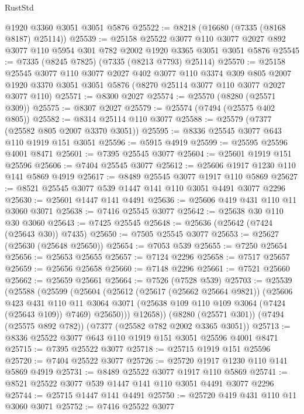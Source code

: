 \begin{lexlean}{RustStd}
\begin{coremodule}
    @1920
    @3360
    @3051
    @3051
    @5876
@25522 := @8218 (@16680 (@7335 (@8168 @8187) @25114))
@25539 := @25158
    @25522
    @3077
    @110
    @3077
    @2027
    @892
    @3077
    @110
    @5954
    @301
    @782
    @2002
    @1920
    @3365
    @3051
    @3051
    @5876
@25545 := @7335 (@8245 @7825) (@7335 (@8213 @7793) @25114)
@25570 := @25158
    @25545
    @3077
    @110
    @3077
    @2027
    @402
    @3077
    @110
    @3374
    @309
    @805
    @2007
    @1920
    @3370
    @3051
    @3051
    @5876
    (@8270 @25114 @3077 @110 @3077 @2027 @3077 @110)
@25571 := @8300 @2027
@25574 := @25570 (@8280 (@25571 @309))
@25575 := @8307 @2027
@25579 := @25574 (@7494 (@25575 @402 @805))
@25582 := @8314 @25114 @110 @3077
@25588 := @25579 (@7377 (@25582 @805 @2007 @3370 @3051))
@25595 := @8336 @25545 @3077 @643 @110 @1919 @151 @3051
@25596 := @5915 @4919
@25599 := @25595 @25596 @4001 @8471
@25601 := @7395 @25545 @3077
@25604 := @25601 @1919 @151 @25596
@25606 := @7404 @25545 @3077
@25612 := @25606 @1917 @1230 @110 @141 @5869 @4919
@25617 := @8489 @25545 @3077 @1917 @110 @5869
@25627 := @8521 @25545 @3077 @539 @1447 @141 @110 @3051 @4491 @3077 @2296
@25630 := @25601 @1447 @141 @4491
@25636 := @25606 @419 @431 @110 @11 @3060 @3071
@25638 := @7416 @25545 @3077
@25642 := @25638 @30 @110 @30 @3060
@25643 := @7425 @25545
@25648 := @25636 (@25642 (@7424 (@25643 @30)) @7435)
@25650 := @7505 @25545 @3077
@25653 := @25627 (@25630 (@25648 @25650))
@25654 := @7053 @539
@25655 := @7250 @25654
@25656 := @25653 @25655
@25657 := @7124 @2296
@25658 := @7517 @25657
@25659 := @25656 @25658
@25660 := @7148 @2296
@25661 := @7521 @25660
@25662 := @25659 @25661
@25664 := @7526 (@7528 @539)
@25703 := @25539
    (@25588
      (@25599
        (@25604
          (@25612
            (@25617 (@25662 @25664 @9821))
            (@25606
              @423
              @431
              @110
              @11
              @3064
              @3071
              (@25638 @109 @110 @109 @3064 (@7424 (@25643 @109)) @7469)
              @25650)))
        @12658))
    (@8280 (@25571 @301))
    (@7494 (@25575 @892 @782))
    (@7377 (@25582 @782 @2002 @3365 @3051))
@25713 := @8336 @25522 @3077 @643 @110 @1919 @151 @3051 @25596 @4001 @8471
@25715 := @7395 @25522 @3077
@25718 := @25715 @1919 @151 @25596
@25720 := @7404 @25522 @3077
@25726 := @25720 @1917 @1230 @110 @141 @5869 @4919
@25731 := @8489 @25522 @3077 @1917 @110 @5869
@25741 := @8521 @25522 @3077 @539 @1447 @141 @110 @3051 @4491 @3077 @2296
@25744 := @25715 @1447 @141 @4491
@25750 := @25720 @419 @431 @110 @11 @3060 @3071
@25752 := @7416 @25522 @3077

\end{coremodule}
\end{lexlean}
